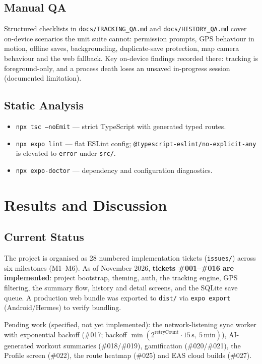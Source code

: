 \documentclass[11pt,a4paper]{report}
\begin{document}
\section{Manual QA}
Structured checklists in \texttt{docs/TRACKING\_QA.md} and \texttt{docs/HISTORY\_QA.md} cover on-device scenarios the unit suite cannot: permission prompts, GPS behaviour in motion, offline saves, backgrounding, duplicate-save protection, map camera behaviour and the web fallback. Key on-device findings recorded there: tracking is foreground-only, and a process death loses an unsaved in-progress session (documented limitation).

\section{Static Analysis}
\begin{itemize}[nosep]
    \item \texttt{npx tsc --noEmit} --- strict TypeScript with generated typed routes.
    \item \texttt{npx expo lint} --- flat ESLint config; \texttt{@typescript-eslint/no-explicit-any} is elevated to \texttt{error} under \texttt{src/}.
    \item \texttt{npx expo-doctor} --- dependency and configuration diagnostics.
\end{itemize}

\chapter{Results and Discussion}

\section{Current Status}
The project is organised as 28 numbered implementation tickets (\texttt{issues/}) across six milestones (M1--M6). As of November 2026, \textbf{tickets \#001--\#016 are implemented}: project bootstrap, theming, auth, the tracking engine, GPS filtering, the summary flow, history and detail screens, and the SQLite save queue. A production web bundle was exported to \texttt{dist/} via \texttt{expo export} (Android/Hermes) to verify bundling.

Pending work (specified, not yet implemented): the network-listening sync worker with exponential backoff (\#017; backoff $\min(2^{\text{retryCount}} \cdot 15\,\text{s},\ 5\,\text{min})$), AI-generated workout summaries (\#018/\#019), gamification (\#020/\#021), the Profile screen (\#022), the route heatmap (\#025) and EAS cloud builds (\#027).
\end{document}
